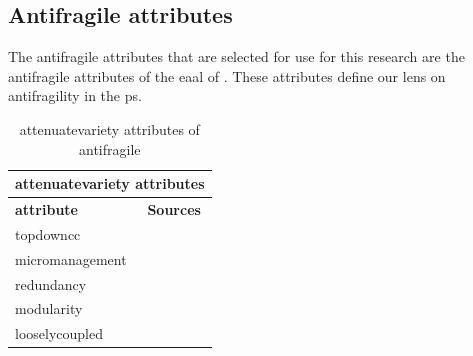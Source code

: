 \subsection{Antifragile attributes}
\label{sub:antifragileattributes}
The \gls{antifragile} \glspl{attribute} that are selected for use for this research are the \gls{antifragile} \glspl{attribute} of the \acrlong{eaal} of \textcite[p.~7]{Botjes2021}. These attributes define our lens on \gls{antifragility} in the \gls{ps}.
\begin{table}[H]
	\begin{center}
			\begin{tabular}{@{}ll@{}}
				\multicolumn{2}{c}{\textbf{\Gls{attenuatevariety} \glspl{attribute}}} \\%
				\toprule %
				\textbf{\Gls{attribute}} & \textbf{Sources} \\%
				\midrule %
				\Gls{topdowncc} & \parencite{Botjes2021} \\%
				\Gls{micromanagement} & \parencite{Botjes2021} \\%
				\Gls{redundancy} & \parencite{Botjes2021} \\%
				\Gls{modularity} & \parencite{Botjes2021} \\%
				\Gls{looselycoupled} & \parencite{Botjes2021} \\%
			\bottomrule%
			\end{tabular}
			\caption[\Gls{attenuatevariety} \glspl{attribute} of \gls{antifragile}]{\Gls{attenuatevariety} \glspl{attribute} of \gls{antifragile}}
			\label{tab:attenuatingattributes}
\end{center}
\end{table}				
